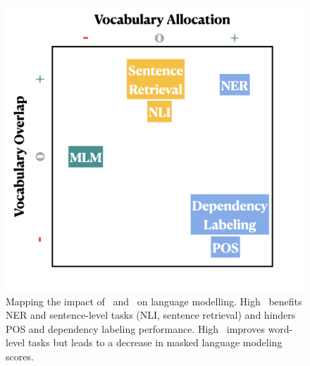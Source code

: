 \begin{figure}[tb!]
    \centering
    \includegraphics[width=0.9 \linewidth]{figures/Schwartz_figure.png}

    \caption{Mapping the impact of \va~and \vo~on language modelling. High \vo~benefits NER and sentence-level tasks (NLI, sentence retrieval) and hinders POS and dependency labeling performance. High \va~improves word-level tasks but leads to a decrease in masked language modeling scores. }
    \label{fig:schwartz}
\end{figure}